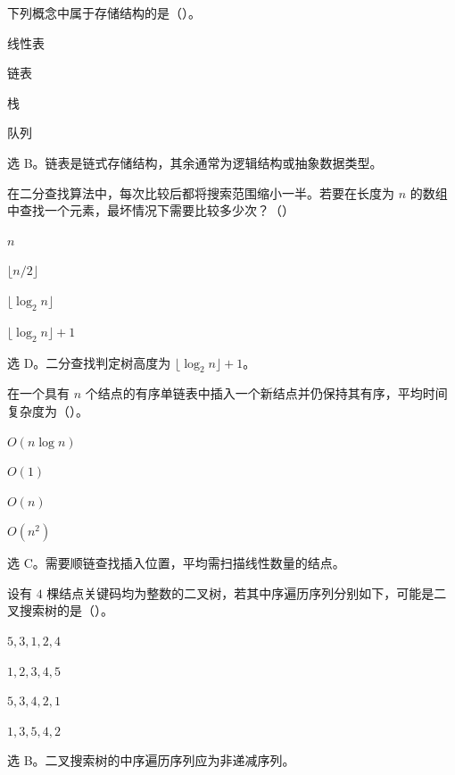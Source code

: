 \begin{question}
下列概念中属于存储结构的是（\quad）。
\begin{choiceoptions}[2]
  \item 线性表
  \item 链表
  \item 栈
  \item 队列
\end{choiceoptions}
\begin{solution}
选 B。链表是链式存储结构，其余通常为逻辑结构或抽象数据类型。
\end{solution}
\end{question}

\begin{question}
在二分查找算法中，每次比较后都将搜索范围缩小一半。若要在长度为 $n$ 的数组中查找一个元素，最坏情况下需要比较多少次？（\quad）
\begin{choiceoptions}[2]
  \item $n$
  \item $\lfloor n/2\rfloor$
  \item $\lfloor\log_2 n\rfloor$
  \item $\lfloor\log_2 n\rfloor+1$
\end{choiceoptions}
\begin{solution}
选 D。二分查找判定树高度为 $\lfloor\log_2 n\rfloor+1$。
\end{solution}
\end{question}

\begin{question}
在一个具有 $n$ 个结点的有序单链表中插入一个新结点并仍保持其有序，平均时间复杂度为（\quad）。
\begin{choiceoptions}[2]
  \item $O(n\log n)$
  \item $O(1)$
  \item $O(n)$
  \item $O(n^2)$
\end{choiceoptions}
\begin{solution}
选 C。需要顺链查找插入位置，平均需扫描线性数量的结点。
\end{solution}
\end{question}

\begin{question}
设有 $4$ 棵结点关键码均为整数的二叉树，若其中序遍历序列分别如下，可能是二叉搜索树的是（\quad）。
\begin{choiceoptions}[2]
  \item $5,3,1,2,4$
  \item $1,2,3,4,5$
  \item $5,3,4,2,1$
  \item $1,3,5,4,2$
\end{choiceoptions}
\begin{solution}
选 B。二叉搜索树的中序遍历序列应为非递减序列。
\end{solution}
\end{question}

